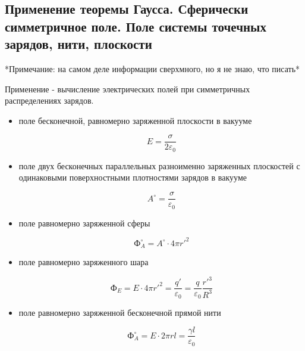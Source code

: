 \subsection{Применение теоремы Гаусса. Сферически симметричное поле. Поле системы точечных зарядов, нити, плоскости}

*Примечание: на самом деле информации сверхмного, но я не знаю, что писать*

Применение - вычисление электрических полей при симметричных распределениях зарядов.
\begin{itemize}
   

    \item  поле бесконечной, равномерно заряженной плоскости в вакууме
    
    $$
    E=\frac{\sigma}{2\varepsilon_0}
    $$
    
    \item поле двух бесконечных параллельных разноименно заряженных плоскостей с одинаковыми поверхностными плотностями зарядов в вакууме
    
    $$
    A^\circ=\frac{\sigma}{\varepsilon_0}
    $$
    
    \item поле равномерно заряженной сферы
    
    $$
    Ф_A^\circ=A^\circ\cdot4\pi r'^2
    $$
    
    \item поле равномерно заряженного шара
    
    $$
    Ф_E=E\cdot4\pi r'^2=\frac{q'}{\varepsilon_0}=\frac{q}{\varepsilon_0}\frac{r'^3}{R^3}
    $$
    
    \item поле равномерно заряженной бесконечной прямой нити
    
    $$
    Ф_A^\circ=E\cdot2\pi rl=\frac{\gamma l}{\varepsilon_0}
    $$
\end{itemize}